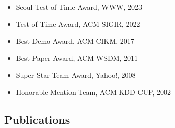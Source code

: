 \documentclass[line,10pt,final]{res}
\begin{document}
\begin{resume}
\begin{itemize}
\item Seoul Test of Time Award, WWW, 2023
\item Test of Time Award, ACM SIGIR, 2022
\item Best Demo Award, ACM CIKM, 2017
\item Best Paper Award, ACM WSDM, 2011
\item Super Star Team Award, Yahoo!, 2008
\item Honorable Mention Team, ACM KDD CUP, 2002
\end{itemize}


\begin{enumerate}

\section{\sc Publications}


\end{enumerate}
\end{resume}
\end{document}
